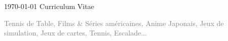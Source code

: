 \documentclass[12pt, a4paper]{awesome-cv}
\begin{document}
\makecvheader[L]

\makecvfooter
  {\today}
  {Curriculum Vitae}
  {\thepage}





\newpage




\textcolor{gray}{\hspace{0cm}  Tennis de Table, Films \& Séries américaines, Anime Japonais, Jeux de simulation, Jeux de cartes, Tennis, Escalade...}
      



\end{document}
